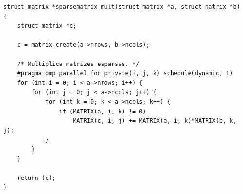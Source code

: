 \documentclass{SBCbookchapter}
\begin{document}
\begin{lstlisting}[float,floatplacement=b,frame=single, caption=Exemplo de multiplicação de matrizes esparsas.,
label=listing:sparsematrixmult]
struct matrix *sparsematrix_mult(struct matrix *a, struct matrix *b)
{
	struct matrix *c;

	c = matrix_create(a->nrows, b->ncols);

	/* Multiplica matrizes esparsas. */
	#pragma omp parallel for private(i, j, k) schedule(dynamic, 1)
	for (int i = 0; i < a->nrows; i++) {
		for (int j = 0; j < a->ncols; j++) {
			for (int k = 0; k < a->ncols; k++) {
				if (MATRIX(a, i, k) != 0)
					MATRIX(c, i, j) += MATRIX(a, i, k)*MATRIX(b, k, j);
			}
		}
	}

	return (c);
}
\end{lstlisting}
		
\end{document}
